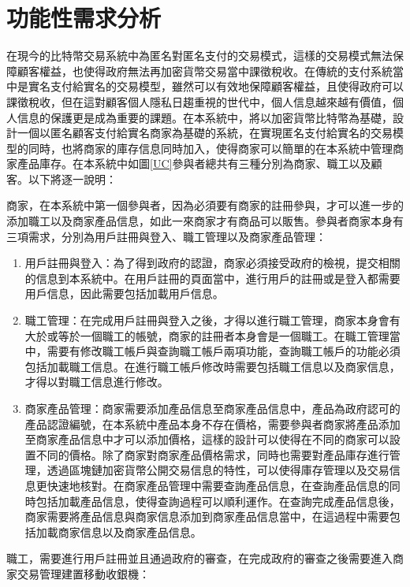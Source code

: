 \section{功能性需求分析}

在現今的比特幣交易系統中為匿名對匿名支付的交易模式，這樣的交易模式無法保障顧客權益，也使得政府無法再加密貨幣交易當中課徵稅收。在傳統的支付系統當中是實名支付給實名的交易模型，雖然可以有效地保障顧客權益，且使得政府可以課徵稅收，但在這對顧客個人隱私日趨重視的世代中，個人信息越來越有價值，個人信息的保護更是成為重要的課題。在本系統中，將以加密貨幣比特幣為基礎，設計一個以匿名顧客支付給實名商家為基礎的系統，在實現匿名支付給實名的交易模型的同時，也將商家的庫存信息同時加入，使得商家可以簡單的在本系統中管理商家產品庫存。在本系統中如圖\ref{UC}參與者總共有三種分別為商家、職工以及顧客。以下將逐一說明：

商家，在本系統中第一個參與者，因為必須要有商家的註冊參與，才可以進一步的添加職工以及商家產品信息，如此一來商家才有商品可以販售。參與者商家本身有三項需求，分別為用戶註冊與登入、職工管理以及商家產品管理：

	\begin{enumerate}
	\item 用戶註冊與登入：為了得到政府的認證，商家必須接受政府的檢視，提交相關的信息到本系統中。在用戶註冊的頁面當中，進行用戶的註冊或是登入都需要用戶信息，因此需要包括加載用戶信息。
	\item 職工管理：在完成用戶註冊與登入之後，才得以進行職工管理，商家本身會有大於或等於一個職工的帳號，商家的註冊者本身會是一個職工。在職工管理當中，需要有修改職工帳戶與查詢職工帳戶兩項功能，查詢職工帳戶的功能必須包括加載職工信息。在進行職工帳戶修改時需要包括職工信息以及商家信息，才得以對職工信息進行修改。
	\item 商家產品管理：商家需要添加產品信息至商家產品信息中，產品為政府認可的產品認證編號，在本系統中產品本身不存在價格，需要參與者商家將產品添加至商家產品信息中才可以添加價格，這樣的設計可以使得在不同的商家可以設置不同的價格。除了商家對商家產品價格需求，同時也需要對產品庫存進行管理，透過區塊鏈加密貨幣公開交易信息的特性，可以使得庫存管理以及交易信息更快速地核對。在商家產品管理中需要查詢產品信息，在查詢產品信息的同時包括加載產品信息，使得查詢過程可以順利運作。在查詢完成產品信息後，商家需要將產品信息與商家信息添加到商家產品信息當中，在這過程中需要包括加載商家信息以及商家產品信息。

	\end{enumerate}

職工，需要進行用戶註冊並且通過政府的審查，在完成政府的審查之後需要進入商家交易管理建置移動收銀機：

